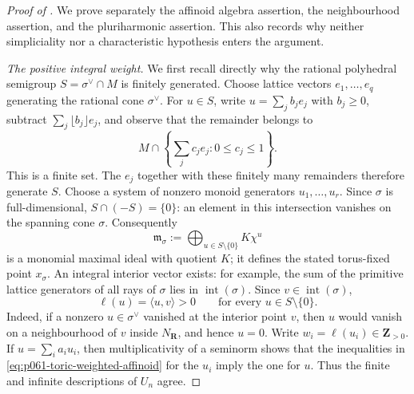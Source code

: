 \begin{proof}[Proof of ]
We prove separately the affinoid algebra assertion, the neighbourhood
assertion, and the pluriharmonic assertion.  This also records why neither
simpliciality nor a characteristic hypothesis enters the argument.

\smallskip
\noindent
\emph{The positive integral weight.}
We first recall directly why the rational polyhedral semigroup
\(S=\sigma^{\vee}\cap M\) is finitely generated.  Choose lattice vectors
\(e_1,\ldots,e_q\) generating the rational cone \(\sigma^{\vee}\).
For \(u\in S\), write \(u=\sum_j b_je_j\) with \(b_j\geq0\), subtract
\(\sum_j\lfloor b_j\rfloor e_j\), and observe that the remainder belongs
to
\[
 M\cap\left\{\sum_j c_je_j:0\leq c_j\leq1\right\}.
\]
This is a finite set.  The \(e_j\) together with these finitely many
remainders therefore generate \(S\).  Choose a system of nonzero monoid
generators \(u_1,\ldots,u_r\).  Since \(\sigma\) is full-dimensional,
\(S\cap(-S)=\{0\}\): an element in this intersection vanishes on the
spanning cone \(\sigma\).  Consequently
\[
 \mathfrak m_{\sigma}:=
 \bigoplus_{u\in S\setminus\{0\}}K\chi^u
\]
is a monomial maximal ideal with quotient \(K\); it defines the stated
torus-fixed point \(x_{\sigma}\).  An integral interior vector exists:
for example, the sum of the primitive lattice generators of all rays of
\(\sigma\) lies in \(\operatorname{int}(\sigma)\).  Since
\(v\in\operatorname{int}(\sigma)\),
\begin{equation}
\label{eq:p061-toric-positive-weight}
       \ell(u)=\langle u,v\rangle>0
       \qquad\text{for every }u\in S\setminus\{0\}.
\end{equation}
Indeed, if a nonzero \(u\in\sigma^{\vee}\) vanished at the interior point
\(v\), then \(u\) would vanish on a neighbourhood of \(v\) inside
\(N_{\mathbf R}\), and hence \(u=0\).  Write
\(w_i=\ell(u_i)\in\mathbf Z_{>0}\).  If
\(u=\sum_i a_i u_i\), then multiplicativity of a seminorm shows that the
inequalities in \eqref{eq:p061-toric-weighted-affinoid} for the \(u_i\)
imply the one for \(u\).  Thus the finite and infinite descriptions of
\(U_n\) agree.


\end{proof}
